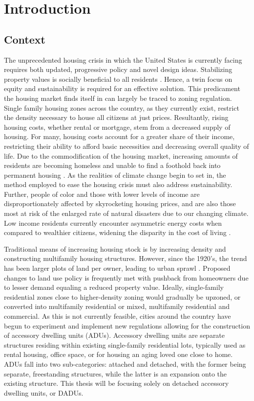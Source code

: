 \chapter {Introduction}

\section{Context}

The unprecedented housing crisis in which the United States is currently facing requires both updated, progressive policy and novel design ideas. Stabilizing property values is socially beneficial to all residents \cite{10.2307/24392672}. Hence, a twin focus on equity and sustainability is required for an effective solution. This predicament the housing market finds itself in can largely be traced to zoning regulation. Single family housing zones across the country, as they currently exist, restrict the density necessary to house all citizens at just prices. Resultantly, rising housing costs, whether rental or mortgage, stem from a decreased supply of housing. For many, housing costs account for a greater share of their income, restricting their ability to afford basic necessities and decreasing overall quality of life. Due to the commodification of the housing market, increasing amounts of residents are becoming homeless and unable to find a foothold back into permanent housing \cite{routhierStateHomeless20212021}. As the realities of climate change begin to set in, the method employed to ease the housing crisis must also address sustainability. Further, people of color and those with lower levels of income are disproportionately affected by skyrocketing housing prices, and are also those most at risk of the enlarged rate of natural disasters due to our changing climate. Low income residents currently encounter asymmetric energy costs when compared to wealthier citizens, widening the disparity in the cost of living \cite{kontokostaEnergyCostBurdens2020a}. 

Traditional means of increasing housing stock is by increasing density and constructing multifamily housing structures. However, since the 1920’s, the trend has been larger plots of land per owner, leading to urban sprawl \cite{hertzImmaculateConceptionTheory15}. Proposed changes to land use policy is frequently met with pushback from homeowners due to lesser demand equaling a reduced property value. Ideally, single-family residential zones close to higher-density zoning would gradually be upzoned, or converted into multifamily residential or mixed, multifamily residential and commercial. As this is not currently feasible, cities around the country have begun to experiment and implement new regulations allowing for the construction of accessory dwelling units (ADUs). Accessory dwelling units are separate structures residing within existing single-family residential lots, typically used as rental housing, office space, or for housing an aging loved one close to home. ADUs fall into two sub-categories: attached and detached, with the former being separate, freestanding structures, while the latter is an expansion onto the existing structure. This thesis will be focusing solely on detached accessory dwelling units, or DADUs.

